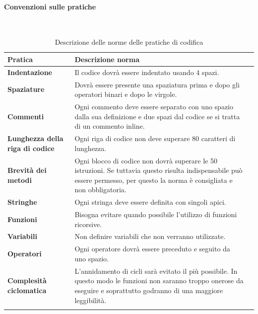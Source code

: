 \paragraph*{Convenzioni sulle pratiche}
\
{
	\setlength{\freewidth}{\dimexpr\textwidth-0\tabcolsep}
	\renewcommand{\arraystretch}{1.5}
	\setlength{\aboverulesep}{0pt}
	\setlength{\belowrulesep}{0pt}
	\begin{longtable}{L{.210\freewidth} L{.6\freewidth} L{.080\freewidth}}
		\rowcolor{AzzurroGruppo!30}
		\textbf{Pratica} & \textbf{Descrizione norma} \\
		\toprule
		\endhead		
		\textbf{Indentazione} & Il codice dovrà essere indentato usando 4 spazi. \\ 
		\textbf{Spaziature} & Dovrà essere presente una spaziatura prima e dopo gli operatori binari e dopo le virgole. \\
		\textbf{Commenti} & Ogni commento deve essere separato con uno spazio dalla sua definizione e due spazi dal codice se si tratta di un commento inline. \\ 
		\textbf{Lunghezza della riga di codice} & Ogni riga di codice non deve superare 80 caratteri di lunghezza. \\
		\textbf{Brevità dei metodi} & Ogni blocco di codice non dovrà superare le 50 istruzioni. Se tuttavia questo risulta indispensabile può essere permesso, per questo la norma è consigliata e non obbligatoria.\\ 	
		\textbf{Stringhe} & Ogni stringa deve essere definita con singoli apici. \\
		\textbf{Funzioni} & Bisogna evitare quando possibile l'utilizzo di funzioni ricorsive.\\ 	
		\textbf{Variabili} & Non definire variabili che non verranno utilizzate.\\ 	
		\textbf{Operatori} & Ogni operatore dovrà essere preceduto e seguito da uno spazio.\\ 	
		\textbf{Complesità ciclomatica} & L'annidamento di cicli sarà evitato il più possibile. In questo modo le funzioni non saranno troppo onerose da eseguire e soprattutto godranno di una maggiore leggibilità. \\  			
		\bottomrule
		\hiderowcolors
		\caption{Descrizione delle norme delle pratiche di codifica}
	\end{longtable}
}
